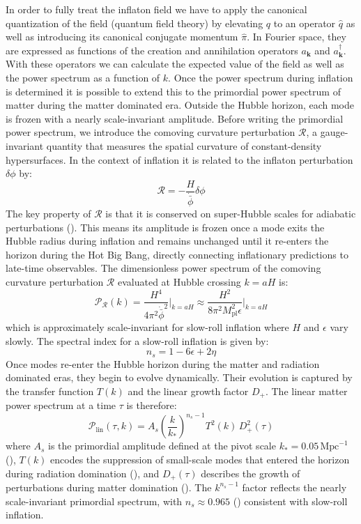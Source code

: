 In order to fully treat the inflaton field we have to apply the canonical quantization of the field (quantum field theory) by elevating $q$ to an operator $\hat{q}$ as well as introducing 
its canonical conjugate momentum $\hat{\pi}$. In Fourier space, they are expressed as functions of the creation and annihilation operators $a_{\mathbf{k}}$ and $a_{\mathbf{k}}^{\dag}$. 
With these operators we can calculate the expected value of the field as well as the power spectrum as a function of $k$. 
Once the power spectrum during inflation is determined it is possible to extend this to the primordial power spectrum of matter during the matter dominated era. 
Outside the Hubble horizon, each mode is frozen with a nearly scale-invariant amplitude. 
Before writing the primordial power spectrum, we introduce the comoving curvature perturbation $\mathcal{R}$, a gauge-invariant 
quantity that measures the spatial curvature of constant-density hypersurfaces. In the context of inflation it is related to the inflaton perturbation $\delta\phi$ by:
\begin{equation}
    \mathcal{R} = -\frac{H}{\dot{\bar{\phi}}}\delta\phi
\end{equation}
The key property of $\mathcal{R}$ is that it is conserved on super-Hubble scales for adiabatic perturbations (\cite{Wands_2000}). 
This means its amplitude is frozen once a mode exits the Hubble radius during inflation and remains unchanged until it re-enters the horizon 
during the Hot Big Bang, directly connecting inflationary predictions to late-time observables.
The dimensionless power spectrum of the comoving curvature perturbation 
$\mathcal{R}$ evaluated at Hubble crossing $k = aH$ is:
\begin{equation}
    \mathcal{P}_{\mathcal{R}}(k) = \frac{H^4}{4\pi^2 \dot{\bar{\phi}}^2}\bigg|_{k=aH} \approx \frac{H^2}{8\pi^2 M_{\text{pl}}^2 \epsilon}\bigg|_{k=aH}
\end{equation}
which is approximately scale-invariant for slow-roll inflation where $H$ and $\epsilon$ vary slowly. The spectral index for a slow-roll inflation is given by:
\begin{equation}
    n_s = 1 - 6\epsilon + 2\eta
\end{equation}
Once modes re-enter the Hubble horizon during the matter and radiation dominated eras, they begin to evolve dynamically. Their evolution is captured by 
the transfer function $T(k)$ and the linear growth factor $D_+$. The linear matter power spectrum at a time $\tau$ is therefore:
\begin{equation}
    \mathcal{P}_{\text{lin}}(\tau, k) = A_s \left(\frac{k}{k_*}\right)^{n_s-1} T^2(k)\, D_+^2(\tau)
\end{equation}
where $A_s$ is the primordial amplitude defined at the pivot scale $k_* = 0.05\,{\text{Mpc}}^{-1}$ (\cite{Planck_2018_inflation}), $T(k)$ encodes 
the suppression of small-scale modes that entered the horizon during radiation domination (\cite{Eisenstein_Hu_1998}), and $D_+(\tau)$ describes the  
growth of perturbations during matter domination (\cite{Carroll_1992}). The $k^{n_s-1}$ factor reflects the nearly scale-invariant primordial spectrum, with 
$n_s \approx 0.965$ (\cite{Planck_2018_inflation}) consistent with slow-roll inflation.

